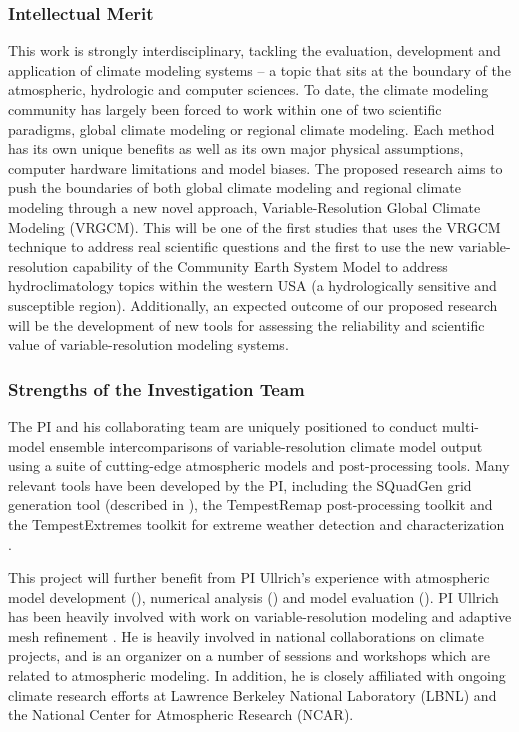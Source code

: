 \documentclass[11pt]{article}
\begin{document}
\subsubsection{Intellectual Merit}

This work is strongly interdisciplinary, tackling the evaluation, development and application of climate modeling systems -- a topic that sits at the boundary of the atmospheric, hydrologic and computer sciences.  To date, the climate modeling community has largely been forced to work within one of two scientific paradigms, global climate modeling or regional climate modeling.  Each method has its own unique benefits as well as its own major physical assumptions, computer hardware limitations and model biases.  The proposed research aims to push the boundaries of both global climate modeling and regional climate modeling through a new novel approach, Variable-Resolution Global Climate Modeling (VRGCM).  This will be one of the first studies that uses the VRGCM technique to address real scientific questions and the first to use the new variable-resolution capability of the Community Earth System Model to address hydroclimatology topics within the western USA (a hydrologically sensitive and susceptible region).  Additionally, an expected outcome of our proposed research will be the development of new tools for assessing the reliability and scientific value of variable-resolution modeling systems. 

\subsubsection{Strengths of the Investigation Team}

The PI and his collaborating team are uniquely positioned to conduct multi-model ensemble intercomparisons of variable-resolution climate model output using a suite of cutting-edge atmospheric models and post-processing tools.  Many relevant tools have been developed by the PI, including the SQuadGen grid generation tool (described in \cite{guba2014viscosity}), the TempestRemap post-processing toolkit \citep{ullrich2015remapping} and the TempestExtremes toolkit for extreme weather detection and characterization \citep{ullrich2015extremes}.

This project will further benefit from PI Ullrich's experience with atmospheric model development  (\cite{ullrich2010high, PHLPAURDN2011SPRINGER, ullrich2012operator, ullrich2012mcore, ullrich2014fluxform, guba2014viscosity, ullrich2014understanding, ullrich2014global}), numerical analysis (\cite{ullrich2011analysis, ullrich2012considerations}) and model evaluation (\cite{DCMIP2012TESTCASES, ullrich2014proposed, kent2013dynamical, ullrich2014baroclinic}).  PI Ullrich has been heavily involved with work on variable-resolution modeling \citep{zarzycki2014aquaplanet} and adaptive mesh refinement  \citep{collins2013nonhydrostatic, mccorquodale2014adaptive}. He is heavily involved in national collaborations on climate projects, and is an organizer on a number of sessions and workshops which are related to atmospheric modeling. In addition, he is closely affiliated with ongoing climate research efforts at Lawrence Berkeley National Laboratory (LBNL) and the National Center for Atmospheric Research (NCAR).
\end{document}
